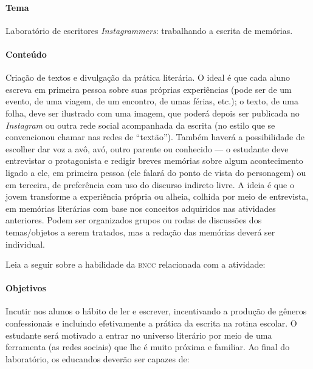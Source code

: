 \documentclass[11pt]{extarticle}
\begin{document}
\paragraph{Tema} Laboratório de escritores \emph{Instagrammers}: trabalhando a escrita de memórias.

\paragraph{Conteúdo} Criação de textos e divulgação da prática literária.
O ideal é que cada aluno escreva em primeira pessoa sobre suas próprias
experiências (pode ser de um evento, de uma viagem, de um encontro, de
umas férias, etc.); o texto, de uma folha, deve ser ilustrado com uma
imagem, que poderá depois ser publicada no \emph{Instagram} ou outra
rede social acompanhada da escrita (no estilo que se convencionou chamar
nas redes de ``textão''). Também haverá a possibilidade de escolher dar
voz a avô, avó, outro parente ou conhecido --- o estudante deve
entrevistar o protagonista e redigir breves memórias sobre algum
acontecimento ligado a ele, em primeira pessoa (ele falará do ponto de
vista do personagem) ou em terceira, de preferência com uso do discurso
indireto livre. A ideia é que o jovem transforme a experiência própria
ou alheia, colhida por meio de entrevista, em memórias literárias com
base nos conceitos adquiridos nas atividades anteriores. Podem ser
organizados grupos ou rodas de discussões dos temas/objetos a serem
tratados, mas a redação das memórias deverá ser individual.

Leia a seguir sobre a habilidade da \textsc{bncc} relacionada com a atividade:


\paragraph{Objetivos}

Incutir nos alunos o hábito de ler e escrever,
incentivando a produção de gêneros confessionais e incluindo
efetivamente a prática da escrita na rotina escolar. O estudante será
motivado a entrar no universo literário por meio de uma ferramenta (as
redes sociais) que lhe é muito próxima e familiar. Ao final do
laboratório, os educandos deverão ser capazes de:
\end{document}
